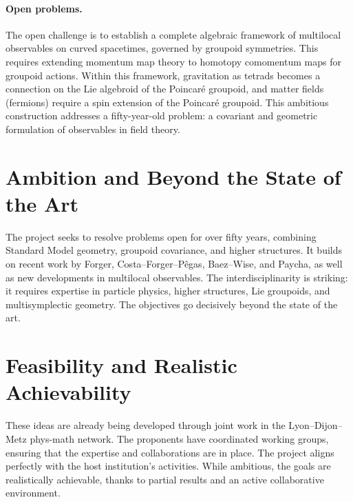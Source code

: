 \documentclass[11pt,a4paper]{article}
\begin{document}
\paragraph{Open problems.}
The open challenge is to establish a complete algebraic framework of multilocal observables on curved spacetimes, governed by groupoid symmetries. This requires extending momentum map theory to homotopy comomentum maps for groupoid actions. Within this framework, gravitation as tetrads becomes a connection on the Lie algebroid of the Poincaré groupoid, and matter fields (fermions) require a spin extension of the Poincaré groupoid. This ambitious construction addresses a fifty-year-old problem: a covariant and geometric formulation of observables in field theory.

\section{Ambition and Beyond the State of the Art}

The project seeks to resolve problems open for over fifty years, combining Standard Model geometry, groupoid covariance, and higher structures. It builds on recent work by Forger, Costa–Forger–Pêgas, Baez–Wise, and Paycha, as well as new developments in multilocal observables. The interdisciplinarity is striking: it requires expertise in particle physics, higher structures, Lie groupoids, and multisymplectic geometry. The objectives go decisively beyond the state of the art.

\section{Feasibility and Realistic Achievability}

These ideas are already being developed through joint work in the Lyon–Dijon–Metz phys-math network. The proponents have coordinated working groups, ensuring that the expertise and collaborations are in place. The project aligns perfectly with the host institution’s activities. While ambitious, the goals are realistically achievable, thanks to partial results and an active collaborative environment.



\end{document}
